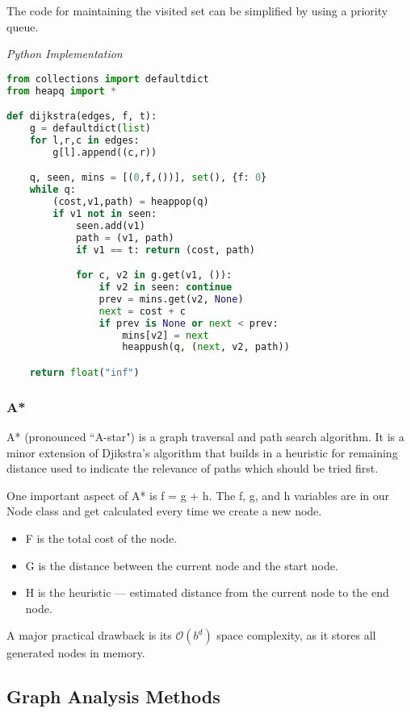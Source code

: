 \documentclass{article}
\newcommand{\bigO}{\ensuremath{\mathcal{O}}}
\begin{document}
    The code for maintaining the visited set can be simplified by using a priority queue.
    
\vspace{8pt} \emph{Python Implementation}
\begin{lstlisting}[language=Python]
from collections import defaultdict
from heapq import *

def dijkstra(edges, f, t):
    g = defaultdict(list)
    for l,r,c in edges:
        g[l].append((c,r))

    q, seen, mins = [(0,f,())], set(), {f: 0}
    while q:
        (cost,v1,path) = heappop(q)
        if v1 not in seen:
            seen.add(v1)
            path = (v1, path)
            if v1 == t: return (cost, path)

            for c, v2 in g.get(v1, ()):
                if v2 in seen: continue
                prev = mins.get(v2, None)
                next = cost + c
                if prev is None or next < prev:
                    mins[v2] = next
                    heappush(q, (next, v2, path))

    return float("inf")
\end{lstlisting}

    \subsubsection{A*}
    A* (pronounced ``A-star") is a graph traversal and path search algorithm. It is a minor extension of Djikstra's algorithm that builds in a heuristic for remaining distance used to indicate the relevance of paths which should be tried first.
    
    One important aspect of A* is f = g + h. The f, g, and h variables are in our Node class and get calculated every time we create a new node. 
    \begin{itemize}
        \item  F is the total cost of the node.
        \item G is the distance between the current node and the start node.
        \item H is the heuristic — estimated distance from the current node to the end node.
    \end{itemize}
    
    A major practical drawback is its $\bigO(b^d)$ space complexity, as it stores all generated nodes in memory.
   
    
    \subsection{Graph Analysis Methods}
\end{document}
